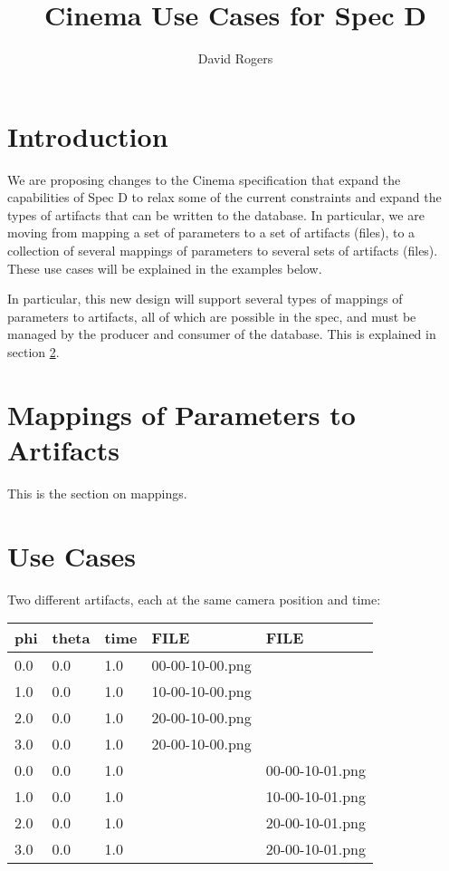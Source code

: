 \documentclass{article}
\begin{document}
\title{Cinema Use Cases for Spec D}
\author{David Rogers}

\maketitle

\section{Introduction}
We are proposing changes to the Cinema specification that expand the
capabilities of Spec D to relax some of the current constraints and expand the
types of artifacts that can be written to the database. In particular, we are
moving from mapping a set of parameters to a set of artifacts (files), to
a collection of several mappings of parameters to several sets of artifacts
(files). These use cases will be explained in the examples below.

In particular, this new design will support several types of mappings of
parameters to artifacts, all of which are possible in the spec, and must be
managed by the producer and consumer of the database. This is explained in
section \ref{s:mappings}.

\section{Mappings of Parameters to Artifacts} \label{s:mappings}
This is the section on mappings.

\section{Use Cases}
Two different artifacts, each at the same camera position and time:
\begin{center}
\begin{tabular}{l|l|l|l|l}
phi & theta & time & FILE & FILE \\
\hline
0.0 & 0.0 & 1.0 & 00-00-10-00.png & \\
1.0 & 0.0 & 1.0 & 10-00-10-00.png & \\
2.0 & 0.0 & 1.0 & 20-00-10-00.png & \\
3.0 & 0.0 & 1.0 & 20-00-10-00.png & \\
0.0 & 0.0 & 1.0 & & 00-00-10-01.png \\
1.0 & 0.0 & 1.0 & & 10-00-10-01.png \\
2.0 & 0.0 & 1.0 & & 20-00-10-01.png \\
3.0 & 0.0 & 1.0 & & 20-00-10-01.png \\
\end{tabular}
\end{center}
\end{document}
